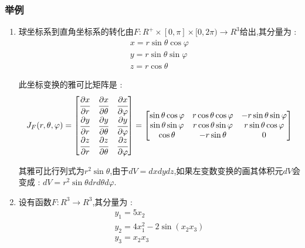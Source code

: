 \documentclass[UTF8,12pt]{ctexbook}
\newcommand{\partialDerivativeFrac}[2]{\cfrac{\partial #1}{\partial #2}}
\begin{document}
{{{    \subsubsection{举例}{
      \begin{enumerate}
        \item {
              球坐标系到直角坐标系的转化由$F : R^+\times[0,\pi]\times[0,2\pi) \to R^3$给出,其分量为 :
              $$
                \begin{array}{l}
                  x = r\sin\theta\cos\varphi \\
                  y = r\sin\theta\sin\varphi \\
                  z = r\cos\theta
                \end{array}
              $$

              此坐标变换的雅可比矩阵是 :
              $$
                J_F(r,\theta,\varphi)
                =
                \begin{bmatrix}
                  \partialDerivativeFrac{x}{r} & \partialDerivativeFrac{x}{\theta} & \partialDerivativeFrac{x}{\varphi} \\
                  \partialDerivativeFrac{y}{r} & \partialDerivativeFrac{y}{\theta} & \partialDerivativeFrac{y}{\varphi} \\
                  \partialDerivativeFrac{z}{r} & \partialDerivativeFrac{z}{\theta} & \partialDerivativeFrac{z}{\varphi}
                \end{bmatrix}
                =
                \begin{bmatrix}
                  \sin\theta\cos\varphi & r\cos\theta\cos\varphi & -r\sin\theta\sin\varphi \\
                  \sin\theta\sin\varphi & r\cos\theta\sin\varphi & r\sin\theta\cos\varphi  \\
                  \cos\theta            & -r\sin\theta           & 0
                \end{bmatrix}
              $$

              其雅可比行列式为$r^2\sin\theta$,由于$dV = dxdydz$,如果左变数变换的画其体积元$dV$会变成 : $dV = r^2\sin\theta dr d\theta d\varphi$.
              }
        \item {
              设有函数$F : R^3 \to R^3$,其分量为 :
              $$
                \begin{array}{l}
                  y_1 = 5x_2                   \\
                  y_2 = 4x_1^2 - 2\sin(x_2x_3) \\
                  y_3 = x_2x_3
                \end{array}
              $$

}
\end{enumerate}}}}}
\end{document}
